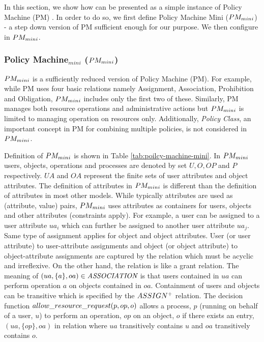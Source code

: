 \label{sec:pm}


In this section, we show how \eapABAC{} can be presented as a simple instance of Policy Machine (PM) \cite{policy-machine}. In order to do so, we first define Policy Machine Mini ($PM_{mini}{}$) - a step down version of PM sufficient enough for our purpose. We then configure \hlabac{} in $PM_{mini}{}$.

\subsubsection{Policy Machine$_{mini}$ ($PM_{mini}{}$)}

$PM_{mini}{}$ is a sufficiently reduced version of Policy Machine (PM).  For example, while PM uses four basic relations namely Assignment, Association, Prohibition and Obligation, $PM_{mini}$ includes only the first two of these. Similarly, PM manages both resource operations and administrative actions but $PM_{mini}$ is limited to managing operation on resources only.  Additionally, \textit{Policy Class}, an important concept in PM for combining multiple policies, is not considered in $PM_{mini}$. 




Definition of $PM_{mini}{}$ is shown in Table \ref{tab:poilcy-machine-mini}. In $PM_{mini}{}$ users, objects, operations and processes are denoted by set $U, O, OP$ and $P$ respectively. $UA$ and $OA$ represent the finite sets of user attributes and object attributes. The definition of attributes in $PM_{mini}$ is different than the definition of attributes in most other models. While typically attributes are used as (attribute, value) pairs, $PM_{mini}$ uses attributes  as containers for users, objects and other attributes (constraints apply). For example, a user can be assigned to a user attribute $ua_i$ which can further be assigned to another user attribute $ua_j$. Same type of assignment applies for object and object attributes. User (or user attribute) to user-attribute  assignments and object (or object attribute) to object-attribute assignments are captured by the \textit{\assignment}{} relation which must be acyclic and irreflexive. On the other hand, the \textit{\association}{} relation is like a grant relation. The meaning of $(ua,\{a\},oa) \in \textit{ASSOCIATION}$ is that users contained in $ua$ can perform operation $a$ on objects contained in $oa$. Containment of users and objects can be transitive which is specified by the $ASSIGN^+{}$ relation. The decision function  $allow\_resource\_request(p,op,o)$ allows a process, $p$ (running on behalf of a user, $u$) to perform an operation, $op$ on an object, $o$ if there exists an entry, $(ua,\{op\},oa)$ in \textit{\association}{} relation  where $ua$ transitively contains $u$ and $oa$ transitively contains $o$.


